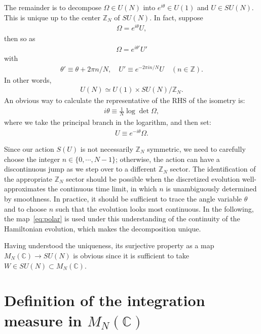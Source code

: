 \documentclass[12pt]{article}
\begin{document}
The remainder is to decompose $\Omega \in U(N)$
into $e^{i\theta} \in U(1)$ and $U \in SU(N)$.
This is unique up to the center $\mathbb{Z}_{N}$ of $SU(N)$.
In fact, suppose
\begin{align}
  \Omega = e^{i \theta} U,
\end{align}
then so as
\begin{align}
  \Omega = e^{i \theta'} U'
\end{align}
with
\begin{align}
  \theta' \equiv \theta + 2\pi n/N,
  \quad
  U' \equiv e^{-2\pi i n/N} U
  \quad (n \in \mathbb{Z}).
\end{align}
In other words,
\begin{align}
  U(N) \simeq U(1) \times SU(N) / \mathbb{Z}_{N}.
\end{align}
An obvious way to calculate the representative of the RHS of the isometry is:
\begin{align}
  i\theta \equiv \frac{1}{N} \log \det \Omega,
\end{align}
where we take the principal branch in the logarithm,
and then set:
\begin{align}
  U \equiv e^{-i\theta} \Omega.
\end{align}

Since our action $S(U)$ is not necessarily $\mathbb{Z}_{N}$ symmetric,
we need to carefully choose the integer $n \in \{0,\cdots,N-1\}$;
otherwise, the action can have a discontinuous jump
as we step over to a different $\mathbb{Z}_N$ sector.
The identification of the appropriate $\mathbb{Z}_{N}$ sector
should be possible when
the discretized evolution well-approximates the continuous time limit,
in which $n$ is unambiguously determined by smoothness.
In practice, it should be sufficient to trace
the angle variable $\theta$
and to choose $n$ such that the evolution looks most continuous.
In the following, the map~\eqref{eq:polar}
is used under this understanding of the continuity of the Hamiltonian evolution,
which makes the decomposition unique.

Having understood the uniqueness,
its surjective property as a map $M_N(\mathbb{C}) \to SU(N)$ is obvious
since it is sufficient to take $W \in SU(N) \subset M_N(\mathbb{C})$.


\section{Definition of the integration measure in $M_N(\mathbb{C})$}
\label{sec:measure}
\end{document}
